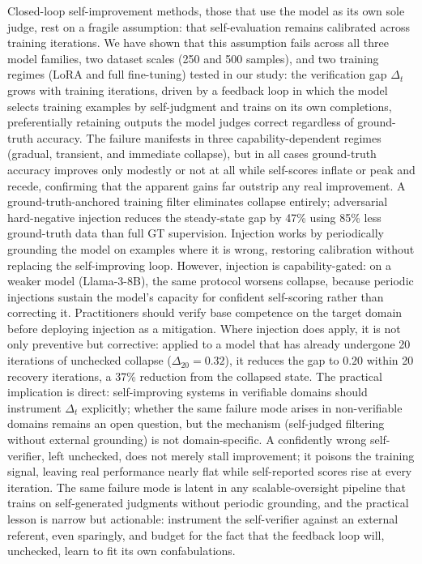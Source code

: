 \documentclass{article}
\begin{document}
Closed-loop self-improvement methods, those that use the model as its own
sole judge, rest on a fragile assumption: that self-evaluation remains
calibrated across training iterations.
We have shown that this assumption fails across all three model families,
two dataset scales (250 and 500 samples), and two training regimes
(LoRA and full fine-tuning) tested in our study: the
verification gap $\Delta_t$ grows with training iterations, driven by a
feedback loop in which the model selects training examples by self-judgment
and trains on its own completions, preferentially retaining outputs the
model judges correct regardless of ground-truth accuracy.
The failure manifests in three capability-dependent regimes (gradual,
transient, and immediate collapse), but in all cases ground-truth accuracy
improves only modestly or not at all while self-scores inflate or peak and recede, confirming that
the apparent gains far outstrip any real improvement.
A ground-truth-anchored training filter eliminates collapse entirely;
adversarial hard-negative injection reduces the steady-state gap by 47\%
using 85\% less ground-truth data than full GT supervision.
Injection works by periodically grounding the model on examples where it is
wrong, restoring calibration without replacing the self-improving loop.
However, injection is capability-gated: on a weaker model (Llama-3-8B), the
same protocol worsens collapse, because periodic injections sustain the
model's capacity for confident self-scoring rather than correcting it.
Practitioners should verify base competence on the target domain before
deploying injection as a mitigation.
Where injection does apply, it is not only preventive but corrective: applied
to a model that has already undergone 20 iterations of unchecked collapse
($\Delta_{20} = 0.32$), it reduces the gap to $0.20$ within 20 recovery
iterations, a 37\% reduction from the collapsed state.
The practical implication is direct: self-improving systems in verifiable
domains should instrument $\Delta_t$ explicitly; whether the same failure mode
arises in non-verifiable domains remains an open question, but the mechanism
(self-judged filtering without external grounding) is not domain-specific.
A confidently wrong self-verifier, left unchecked, does not merely stall
improvement; it poisons the training signal, leaving real performance
nearly flat while self-reported scores rise at every iteration.
The same failure mode is latent in any scalable-oversight pipeline that trains
on self-generated judgments without periodic grounding, and the practical
lesson is narrow but actionable: instrument the self-verifier against an
external referent, even sparingly, and budget for the fact that the feedback
loop will, unchecked, learn to fit its own confabulations.
\end{document}
